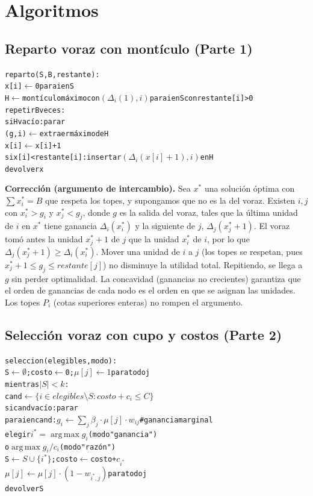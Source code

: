 \documentclass[11pt,a4paper]{article}
\DeclareMathOperator*{\argmax}{arg\,max}
\begin{document}
\section{Algoritmos}

\subsection{Reparto voraz con montículo (Parte 1)}

\begin{alltt}
reparto(S, B, restante):
    x[i] \(\leftarrow\) 0  para i en S
    H \(\leftarrow\) montículo máximo con \((\Delta_i(1), i)\) para i en S con restante[i] > 0
    repetir B veces:
        si H vacío: parar
        (g, i) \(\leftarrow\) extraer máximo de H
        x[i] \(\leftarrow\) x[i] + 1
        si x[i] < restante[i]: insertar \((\Delta_i(x[i]+1), i)\) en H
    devolver x
\end{alltt}

\textbf{Corrección (argumento de intercambio).} Sea $x^*$ una solución óptima
con $\sum x_i^*=B$ que respeta los topes, y supongamos que no es la del voraz.
Existen $i,j$ con $x_i^*>g_i$ y $x_j^*<g_j$, donde $g$ es la salida del voraz,
tales que la última unidad de $i$ en $x^*$ tiene ganancia $\Delta_i(x_i^*)$ y la
siguiente de $j$, $\Delta_j(x_j^*+1)$. El voraz tomó antes la unidad
$x_j^*+1$ de $j$ que la unidad $x_i^*$ de $i$, por lo que
$\Delta_j(x_j^*+1)\ge\Delta_i(x_i^*)$. Mover una unidad de $i$ a $j$ (los topes
se respetan, pues $x_j^*+1\le g_j\le\mathit{restante}[j]$) no disminuye la
utilidad total. Repitiendo, se llega a $g$ sin perder optimalidad. La concavidad
(ganancias no crecientes) garantiza que el orden de ganancias de cada nodo es el
orden en que se asignan las unidades. Los topes $P_i$ (cotas superiores enteras)
no rompen el argumento.

\subsection{Selección voraz con cupo y costos (Parte 2)}

\begin{alltt}
seleccion(elegibles, modo):
    S \(\leftarrow \emptyset\) ; costo \(\leftarrow\) 0 ; \(\mu[j] \leftarrow 1\) para todo j
    mientras \(|S| < k\):
        cand \(\leftarrow \{ i \in \mathit{elegibles} \setminus S : \mathit{costo} + c_i \le C \}\)
        si cand vacío: parar
        para i en cand: \(g_i \leftarrow \sum_j \beta_j \cdot \mu[j] \cdot w_{ij}\)   \# ganancia marginal
        elegir \(i^* = \argmax g_i\)              (modo "ganancia")
               o  \(\argmax g_i / c_i\)          (modo "razón")
        S \(\leftarrow S \cup \{i^*\}\) ; costo \(\leftarrow\) costo + \(c_{i^*}\)
        \(\mu[j] \leftarrow \mu[j] \cdot (1 - w_{i^*,j})\) para todo j
    devolver S
\end{alltt}
\end{document}
